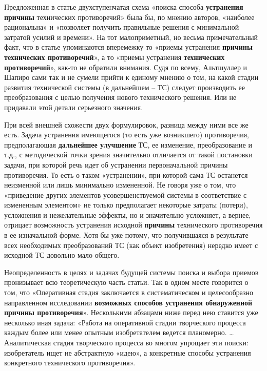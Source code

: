 \documentclass[11pt,a4paper]{article}
\begin{document}
Предложенная в статье \cite{Altshuller1956} двухступенчатая схема «поиска
способа \textbf{устранения причины} технических противоречий» была бы, по
мнению авторов, «наиболее рациональна» и «позволяет получить правильные
решения с минимальной затратой усилий и времени». На тот малоприметный, но
весьма примечательный факт, что в статье упоминаются вперемежку то «приемы
устранения \textbf{причины технических противоречий}», а то «приемы устранения
\textbf{технических противоречий}», как-то не обратили внимания. Судя по
всему, Альтшуллер и Шапиро сами так и не сумели прийти к единому мнению о том,
на какой стадии развития технической системы (в дальнейшем -- ТС) следует
производить ее преобразования с целью получения нового технического
решения. Или не придавали этой детали серьезного значения.

При всей внешней схожести двух формулировок, разница между ними все же есть.
Задача устранения имеющегося (то есть уже возникшего) противоречия,
предполагающая \textbf{дальнейшее улучшение} ТС, ее изменение, преобразование
и т.д., с методической точки зрения значительно отличается от такой постановки
задачи, при которой речь идет об устранении первоначальной причины
противоречия. То есть о таком «устранении», при которой сама ТС останется
неизменной или лишь минимально измененной. Не говоря уже о том, что
«приведение других элементов усовершенствуемой системы в соответствие с
измененным элементом» не только предполагает некоторые затраты (потери),
усложнения и нежелательные эффекты, но и значительно усложняет, а вернее,
отрицает возможность устранения исходной \textbf{причины} технического
противоречия в ее изначальной форме. Хотя бы уже потому, что получившаяся в
результате всех необходимых преобразований ТС (как объект изобретения) нередко
имеет с исходной ТС довольно мало общего.

Неопределенность в целях и задачах будущей системы поиска и выбора приемов
пронизывает всю теоретическую часть статьи. Так в одном месте говорится о том,
что «Оперативная стадия заключается в систематическом и целесообразно
направленном исследовании \textbf{возможных способов устранения обнаруженной
  причины противоречия}». Несколькими абзацами ниже перед нею ставится уже
несколько иная задача: «Работа на оперативной стадии творческого процесса
каждым более или менее опытным изобретателем ведется планомерно. …
Аналитическая стадия творческого процесса во многом упрощает эти поиски:
изобретатель ищет не абстрактную «идею», а конкретные способы устранения
конкретного технического противоречия».
\end{document}
